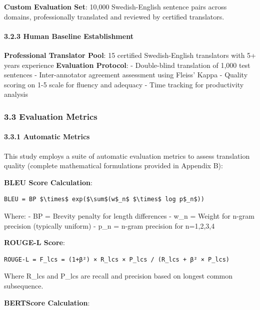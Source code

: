 \documentclass[12pt,a4paper]{article}
\begin{document}
{{\textbf{Custom Evaluation Set}: 10,000 Swedish-English sentence pairs
across domains, professionally translated and reviewed by certified
translators.

\hypertarget{human-baseline-establishment}{%
\paragraph{3.2.3 Human Baseline
Establishment}\label{human-baseline-establishment}}

\textbf{Professional Translator Pool}: 15 certified Swedish-English
translators with 5+ years experience \textbf{Evaluation Protocol}: -
Double-blind translation of 1,000 test sentences - Inter-annotator
agreement assessment using Fleiss' Kappa - Quality scoring on 1-5 scale
for fluency and adequacy - Time tracking for productivity analysis

\hypertarget{evaluation-metrics}{%
\subsubsection{3.3 Evaluation Metrics}\label{evaluation-metrics}}

\hypertarget{automatic-metrics}{%
\paragraph{3.3.1 Automatic Metrics}\label{automatic-metrics}}

This study employs a suite of automatic evaluation metrics
to assess translation quality (complete mathematical formulations
provided in Appendix B):

\textbf{BLEU Score Calculation}:

\begin{verbatim}
BLEU = BP $\times$ exp($\sum$(w$_n$ $\times$ log p$_n$))
\end{verbatim}

Where: - BP = Brevity penalty for length differences - w\_n = Weight for
n-gram precision (typically uniform) - p\_n = n-gram precision for
n=1,2,3,4

\textbf{ROUGE-L Score}:

\begin{verbatim}
ROUGE-L = F_lcs = (1+β²) × R_lcs × P_lcs / (R_lcs + β² × P_lcs)
\end{verbatim}

Where R\_lcs and P\_lcs are recall and precision based on longest common
subsequence.

\textbf{BERTScore Calculation}:

}}
\end{document}
